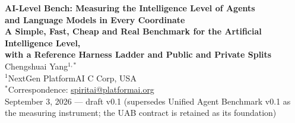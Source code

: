 \documentclass[11pt]{article}
\theoremstyle{definition}
\begin{document}
\begin{center}
{\LARGE\bfseries AI-Level Bench: Measuring the Intelligence Level of Agents}\\[4pt]
{\LARGE\bfseries and Language Models in Every Coordinate}\\[8pt]
{\large\bfseries A Simple, Fast, Cheap and Real Benchmark for the Artificial Intelligence Level,\\[2pt]
with a Reference Harness Ladder and Public and Private Splits}\\[16pt]
{\large Chengshuai Yang$^{1,*}$}\\[5pt]
{\normalsize $^{1}$NextGen PlatformAI C Corp, USA}\\[4pt]
{\normalsize $^{*}$Correspondence: \href{mailto:spiritai@platformai.org}{spiritai@platformai.org}}\\[10pt]
{\small September 3, 2026 --- draft v0.1 (supersedes Unified Agent Benchmark v0.1 as the measuring instrument; the UAB contract is retained as its foundation)}
\end{center}
\end{document}
